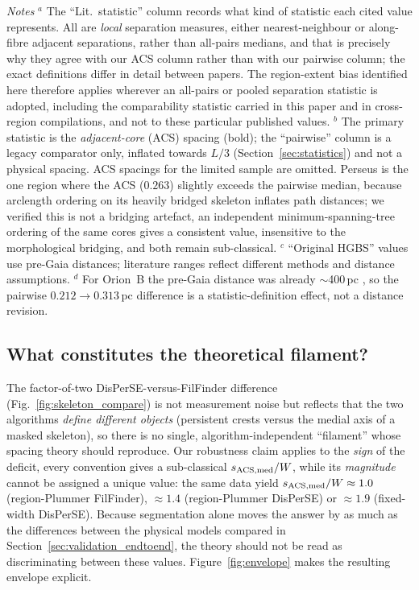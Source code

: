 \documentclass[usenatbib,twoside,twocolumn]{mnras}
\begin{document}
\begin{table}
\vspace{0.1in}
\footnotesize
\emph{Notes} $^{a}$ The ``Lit.\ statistic'' column records what kind of statistic each cited value represents. All are \emph{local} separation measures, either nearest-neighbour or along-fibre adjacent separations, rather than all-pairs medians, and that is precisely why they agree with our ACS column rather than with our pairwise column; the exact definitions differ in detail between papers. The region-extent bias identified here therefore applies wherever an all-pairs or pooled separation statistic is adopted, including the comparability statistic carried in this paper and in cross-region compilations, and not to these particular published values. $^{b}$ The primary statistic is the \emph{adjacent-core} (ACS) spacing (bold); the ``pairwise'' column is a legacy comparator only, inflated towards $L/3$ (Section~\ref{sec:statistics}) and not a physical spacing. ACS spacings for the limited sample are omitted. Perseus is the one region where the ACS ($0.263$) slightly exceeds the pairwise median, because arclength ordering on its heavily bridged skeleton inflates path distances; we verified this is not a bridging artefact, an independent minimum-spanning-tree ordering of the same cores gives a consistent value, insensitive to the morphological bridging, and both remain sub-classical. $^{c}$ ``Original HGBS'' values use pre-Gaia distances; literature ranges reflect different methods and distance assumptions. $^{d}$ For Orion~B the pre-Gaia distance was already $\sim$400\,pc \citep{Konyves2020}, so the pairwise $0.212\to0.313$\,pc difference is a statistic-definition effect, not a distance revision.
\end{table}

\subsection{What constitutes the theoretical filament?}
\label{sec:whatfilament}
The factor-of-two DisPerSE-versus-FilFinder difference (Fig.~\ref{fig:skeleton_compare}) is not measurement noise but reflects that the two algorithms \emph{define different objects} (persistent crests versus the medial axis of a masked skeleton), so there is no single, algorithm-independent ``filament'' whose spacing theory should reproduce. Our robustness claim applies to the \emph{sign} of the deficit, every convention gives a sub-classical $s_{\rm ACS,med}/W$, while its \emph{magnitude} cannot be assigned a unique value: the same data yield $s_{\rm ACS,med}/W\approx1.0$ (region-Plummer FilFinder), $\approx1.4$ (region-Plummer DisPerSE) or $\approx1.9$ (fixed-width DisPerSE). Because segmentation alone moves the answer by as much as the differences between the physical models compared in Section~\ref{sec:validation_endtoend}, the theory should not be read as discriminating between these values. Figure~\ref{fig:envelope} makes the resulting envelope explicit.
\end{document}
